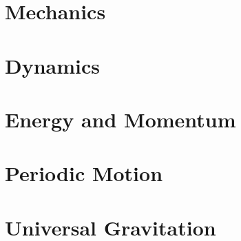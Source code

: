 \documentclass[
  12pt, %
  letterpaper,
]{LegrandOrangeBook}
\begin{document}



\part{Mechanics}






\part{Dynamics}


%


\part{Energy and Momentum}









\part{Periodic Motion}








%
%

\part{Universal Gravitation}
  
\end{document}
